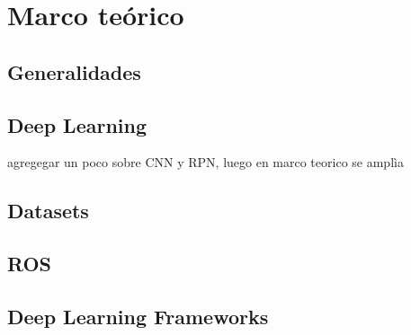 \chapter{Marco teórico}
\label{ch:marco}












\section{Generalidades}

\section{Deep Learning}
agregegar un poco sobre CNN y RPN, luego en marco teorico se amplìa


\section{Datasets}


\section{ROS}


\section{Deep Learning Frameworks}



